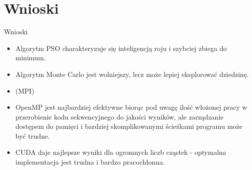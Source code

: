 \documentclass[handout]{beamer}
\begin{document}
\section{Wnioski}
\begin{frame}{Wnioski}
\begin{itemize}
\item Algorytm PSO charakteryzuje się inteligencją roju i szybciej zbiega do minimum.
\item Algorytm Monte Carlo jest wolniejszy, lecz może lepiej eksplorować dziedzinę.
\item (MPI)
\item OpenMP jest najbardziej efektywne biorąc pod uwagę ilość włożonej pracy w przerobienie kodu sekwencyjnego do jakości wyników, ale zarządzanie dostępem do pamięci i bardziej skomplikowanymi ścieżkami programu może być trudne.
\item CUDA daje najlepsze wyniki dla ogromnych liczb cząstek - optymalna implementacja jest trudna i bardzo pracochłonna.
\end{itemize}
\end{frame}
\end{document}

